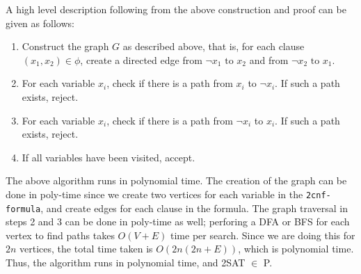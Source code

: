 \documentclass[addpoints,a4paper]{exam}
\begin{document}
\begin{questions}
\begin{solution}
    A high level description following from the above construction and proof can be given as follows: \vspace*{-2mm}
    \begin{enumerate}
      \item Construct the graph $G$ as described above, that is, for each clause $ (x_1, x_2) \in \phi$, create a directed edge from $ \neg x_1 \text{ to } x_2$ and from $ \neg x_2 \text{ to } x_1 $. \vspace*{-1mm}
      \item For each variable $x_i$, check if there is a path from $x_i$ to $ \neg x_i $. If such a path exists, reject. \vspace*{-1mm}
      \item For each variable $x_i$, check if there is a path from $ \neg x_i $ to $x_i$. If such a path exists, reject. \vspace*{-1mm}
      \item If all variables have been visited, accept.
    \end{enumerate}

    The above algorithm runs in polynomial time. The creation of the graph can be done in poly-time since we create two vertices for each variable in the \texttt{2cnf-formula}, and create edges for each clause in the formula. The graph traversal in steps 2 and 3 can be done in poly-time as well; perforing a DFA or BFS for each vertex to find paths takes $O(V + E)$ time per search. Since we are doing this for $2n$ vertices, the total time taken is $O(2n(2n + E))$, which is polynomial time. Thus, the algorithm runs in polynomial time, and 2SAT $\in$ P. 

  \end{solution}

\end{questions}
\end{document}
